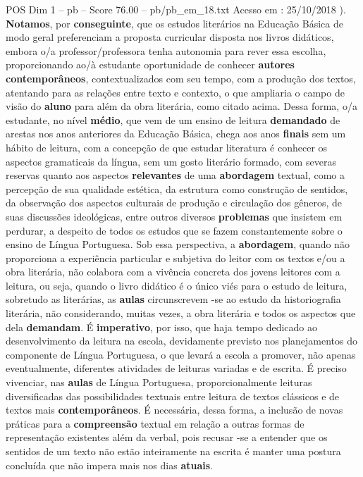 \begin{textsample}{POS Dim 1 – pb – Score 76.00 – pb/pb\_em\_18.txt}
Acesso em : 25/10/2018 ). \textbf{Notamos}, por \textbf{conseguinte}, que os estudos literários na Educação Básica de modo geral preferenciam a proposta curricular disposta nos livros didáticos, embora o/a professor/professora tenha autonomia para rever essa escolha, proporcionando ao/à estudante oportunidade de conhecer \textbf{autores} \textbf{contemporâneos}, contextualizados com seu tempo, com a produção dos textos, atentando para as relações entre texto e contexto, o que ampliaria o campo de visão do \textbf{aluno} para além da obra literária, como citado acima.
Dessa forma, o/a estudante, no nível \textbf{médio}, que vem de um ensino de leitura \textbf{demandado} de arestas nos anos anteriores da Educação Básica, chega aos anos \textbf{finais} sem um hábito de leitura, com a concepção de que estudar literatura é conhecer os aspectos gramaticais da língua, sem um gosto literário formado, com severas reservas quanto aos aspectos \textbf{relevantes} de uma \textbf{abordagem} textual, como a percepção de sua qualidade estética, da estrutura como construção de sentidos, da observação dos aspectos culturais de produção e circulação dos gêneros, de suas discussões ideológicas, entre outros diversos \textbf{problemas} que insistem em perdurar, a despeito de todos os estudos que se fazem constantemente sobre o ensino de Língua Portuguesa.
Sob essa perspectiva, a \textbf{abordagem}, quando não proporciona a experiência particular e subjetiva do leitor com os textos e/ou a obra literária, não colabora com a vivência concreta dos jovens leitores com a leitura, ou seja, quando o livro didático é o único viés para o estudo de leitura, sobretudo as literárias, as \textbf{aulas} circunscrevem -se ao estudo da historiografia literária, não considerando, muitas vezes, a obra literária e todos os aspectos que dela \textbf{demandam}.
É \textbf{imperativo}, por isso, que haja tempo dedicado ao desenvolvimento da leitura na escola, devidamente previsto nos planejamentos do componente de Língua Portuguesa, o que levará a escola a promover, não apenas eventualmente, diferentes atividades de leituras variadas e de escrita.
É preciso vivenciar, nas \textbf{aulas} de Língua Portuguesa, proporcionalmente leituras diversificadas das possibilidades textuais entre leitura de textos clássicos e de textos mais \textbf{contemporâneos}.
É necessária, dessa forma, a inclusão de novas práticas para a \textbf{compreensão} textual em relação a outras formas de representação existentes além da verbal, pois recusar -se a entender que os sentidos de um texto não estão inteiramente na escrita é manter uma postura concluída que não impera mais nos dias \textbf{atuais}.

\end{textsample}

